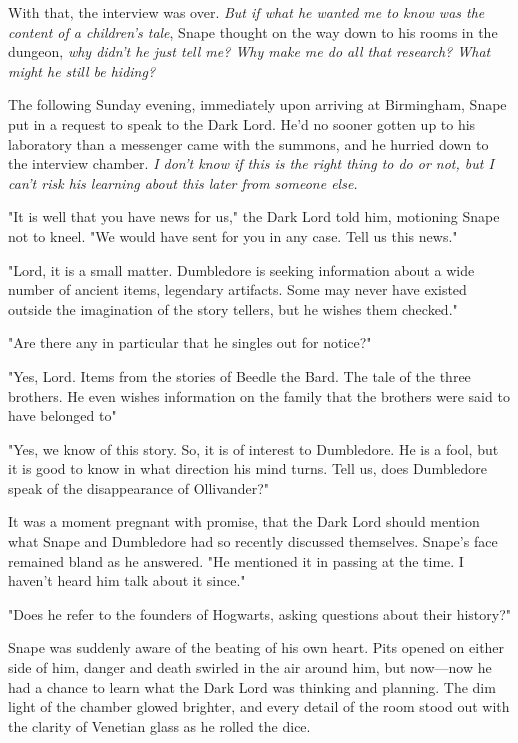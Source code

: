 With that, the interview was over. \emph{But if what he wanted me to know was the content of a children's tale}, Snape thought on the way down to his rooms in the dungeon, \emph{why didn't he just tell me? Why make me do all that research? What might he still be hiding?}

The following Sunday evening, immediately upon arriving at Birmingham, Snape put in a request to speak to the Dark Lord. He'd no sooner gotten up to his laboratory than a messenger came with the summons, and he hurried down to the interview chamber. \emph{I don't know if this is the right thing to do or not, but I can't risk his learning about this later from someone else.}

"It is well that you have news for us," the Dark Lord told him, motioning Snape not to kneel. "We would have sent for you in any case. Tell us this news."

"Lord, it is a small matter. Dumbledore is seeking information about a wide number of ancient items, legendary artifacts. Some may never have existed outside the imagination of the story tellers, but he wishes them checked."

"Are there any in particular that he singles out for notice?"

"Yes, Lord. Items from the stories of Beedle the Bard. The tale of the three brothers. He even wishes information on the family that the brothers were said to have belonged to{\el}"

"Yes, we know of this story. So, it is of interest to Dumbledore. He is a fool, but it is good to know in what direction his mind turns. Tell us, does Dumbledore speak of the disappearance of Ollivander?"

It was a moment pregnant with promise, that the Dark Lord should mention what Snape and Dumbledore had so recently discussed themselves. Snape's face remained bland as he answered. "He mentioned it in passing at the time. I haven't heard him talk about it since."

"Does he refer to the founders of Hogwarts, asking questions about their history?"

Snape was suddenly aware of the beating of his own heart. Pits opened on either side of him, danger and death swirled in the air around him, but now—now he had a chance to learn what the Dark Lord was thinking and planning. The dim light of the chamber glowed brighter, and every detail of the room stood out with the clarity of Venetian glass as he rolled the dice.

